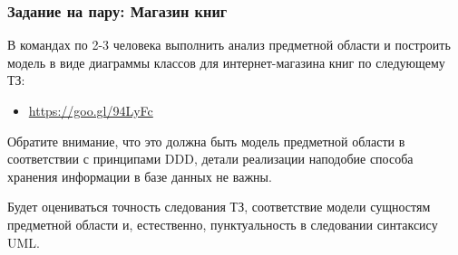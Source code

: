 \documentclass{../../slides-style}
\begin{document}
	\begin{frame}[plain]
		\titlepage
	\end{frame}

	\begin{frame}
		\frametitle{Задание на пару: Магазин книг}
		В командах по 2-3 человека выполнить анализ предметной области и построить модель в виде диаграммы классов для интернет-магазина книг по следующему ТЗ:
		\begin{itemize}
			\item \url{https://goo.gl/94LyFc}
		\end{itemize}

		Обратите внимание, что это должна быть модель предметной области в соответствии с принципами DDD, детали реализации наподобие способа хранения информации в базе данных не важны.

		Будет оцениваться точность следования ТЗ, соответствие модели сущностям предметной области и, естественно, пунктуальность в следовании синтаксису UML.
	\end{frame}
\end{document}
